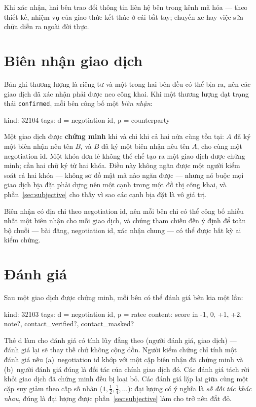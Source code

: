 \documentclass[11pt]{article}
\begin{document}
Khi xác nhận, hai bên trao đổi thông tin liên hệ bên trong kênh mã hóa --- theo
thiết kế, nhiệm vụ của giao thức kết thúc ở cái bắt tay; chuyến xe hay việc
sửa chữa diễn ra ngoài đời thực.

\section{Biên nhận giao dịch}

Bản ghi thương lượng là riêng tư và một trong hai bên đều có thể bịa ra, nên
các giao dịch đã xác nhận phải được neo công khai. Khi một thương lượng đạt
trạng thái \texttt{confirmed}, mỗi bên công bố một \emph{biên nhận}:

\begin{code}
kind:  32104
tags:  d = negotiation id, p = counterparty
\end{code}

Một giao dịch được \textbf{chứng minh} khi và chỉ khi cả hai nửa cùng tồn
tại: $A$ đã ký một biên nhận nêu tên $B$, và $B$ đã ký một biên nhận nêu tên
$A$, cho cùng một negotiation id. Một khóa đơn lẻ không thể chế tạo ra một
giao dịch được chứng minh; cần hai chữ ký từ hai khóa. Điều này không ngăn
được một người kiểm soát cả hai khóa --- không sơ đồ mật mã nào ngăn được ---
nhưng nó buộc mọi giao dịch bịa đặt phải dựng nên một cạnh trong một đồ thị
công khai, và phần~\ref{sec:subjective} cho thấy vì sao các cạnh bịa đặt là vô
giá trị.

Biên nhận có địa chỉ theo negotiation id, nên mỗi bên chỉ có thể công bố nhiều
nhất một biên nhận cho mỗi giao dịch, và chúng tham chiếu đến ý định để toàn
bộ chuỗi --- bài đăng, negotiation id, xác nhận chung --- có thể được bất kỳ
ai kiểm chứng.

\section{Đánh giá}

Sau một giao dịch được chứng minh, mỗi bên có thể đánh giá bên kia một lần:

\begin{code}
kind:  32103
tags:  d = negotiation id, p = ratee
content: { score in {-1, 0, +1, +2}, note?,
           contact_verified?, contact_masked? }
\end{code}

Thẻ d làm cho đánh giá có tính lũy đẳng theo (người đánh giá, giao dịch) ---
đánh giá lại sẽ thay thế chứ không cộng dồn. Người kiểm chứng chỉ tính một
đánh giá nếu (a)~negotiation id khớp với một cặp biên nhận đã chứng minh và
(b)~người đánh giá đúng là đối tác của chính giao dịch đó. Các đánh giá tách
rời khỏi giao dịch đã chứng minh đều bị loại bỏ. Các đánh giá lặp lại giữa
cùng một cặp suy giảm theo cấp số nhân ($1, \tfrac{1}{2}, \tfrac{1}{4},
\dots$): đại lượng có ý nghĩa là \emph{số đối tác khác nhau}, đúng là đại
lượng được phần~\ref{sec:subjective} làm cho trở nên đắt đỏ.
\end{document}
